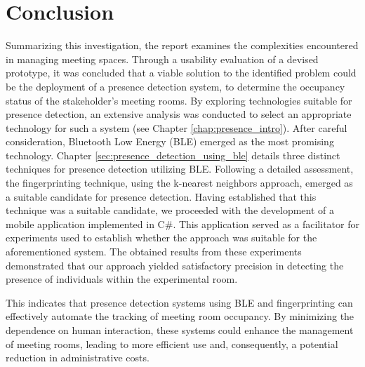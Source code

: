 \chapter{Conclusion}
Summarizing this investigation, the report examines the complexities encountered in managing meeting spaces. 
Through a usability evaluation of a devised prototype, it was concluded that a viable solution to the identified problem could be the deployment of a presence detection system, to determine the occupancy status of the stakeholder's meeting rooms.
By exploring technologies suitable for presence detection, an extensive analysis was conducted to select an appropriate technology for such a system (see Chapter \ref{chap:presence_intro}). 
After careful consideration, Bluetooth Low Energy (BLE) emerged as the most promising technology. 
Chapter \ref{sec:presence_detection_using_ble} details three distinct techniques for presence detection utilizing BLE.
Following a detailed assessment, the fingerprinting technique, using the k-nearest neighbors approach, emerged as a suitable candidate for presence detection.
Having established that this technique was a suitable candidate, we proceeded with the development of a mobile application implemented in C#. 
This application served as a facilitator for experiments used to establish whether the approach was suitable for the aforementioned system. 
The obtained results from these experiments demonstrated that our approach yielded satisfactory precision in detecting the presence of individuals within the experimental room.

This indicates that presence detection systems using BLE and fingerprinting can effectively automate the tracking of meeting room occupancy.
By minimizing the dependence on human interaction, these systems could enhance the management of meeting rooms, leading to more efficient use and, consequently, a potential reduction in administrative costs.